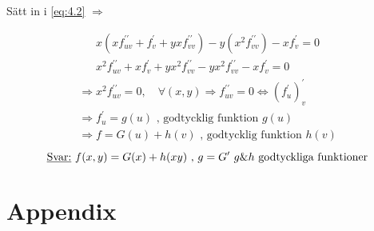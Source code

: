 \documentclass{article}
\begin{document}
Sätt in i \eqref{eq:4.2} \(\Rightarrow\)

\[
\begin{split}
	x(xf_{uv}^{\prime\prime}+f_{v}^{\prime}+yxf_{vv}^{\prime\prime}) - y(x^2f_{vv}^{\prime\prime}) - xf_{v}^{\prime} = 0 \\
	x^2 f_{uv}^{\prime\prime}+xf_{v}^{\prime}+yx^2f_{vv}^{\prime\prime} - yx^2f_{vv}^{\prime\prime} - xf_{v}^{\prime} = 0
\end{split}
\]
\[
\begin{split}
	\Rightarrow x^2f_{uv}^{\prime\prime} = 0, \quad \forall (x,y) 
	\Rightarrow f_{uv}^{\prime\prime} = 0 \iff (f_{u}^{\prime})_{v}^{\prime} \\
	\Rightarrow f_{u}^{\prime} = g(u) \text{ , godtycklig funktion }g(u) \\
	\Rightarrow f = G(u) + h(v) \text{ , godtycklig funktion }h(v)
\end{split}
\]
\[
	\text{\underline{Svar:} } f(x,y) = G(x) + h(xy) \text{ , }g=G^{\prime}\text{  }g\text{\&}h\text{ godtyckliga funktioner}
\]

\newpage
\fancyhf{}
\section{Appendix}
\begin{appendix}
	\listoffigures
	\listoftables
\end{appendix}
\end{document}
